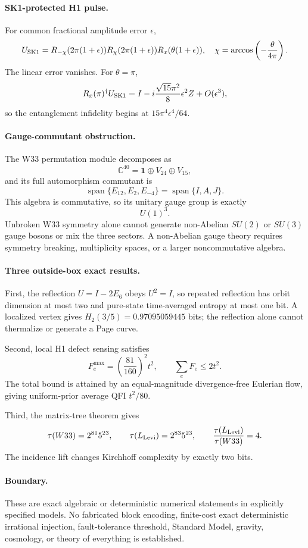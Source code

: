 \paragraph{SK1-protected H1 pulse.}
For common fractional amplitude error $\epsilon$,
\[
U_{\rm SK1}=R_{-\chi}(2\pi(1+\epsilon))R_\chi(2\pi(1+\epsilon))
R_x(\theta(1+\epsilon)),
\quad
\chi=\arccos\left(-\frac\theta{4\pi}\right).
\]
The linear error vanishes.  For $\theta=\pi$,
\[
R_x(\pi)^\dagger U_{\rm SK1}
=I-i\frac{\sqrt{15}\pi^2}{8}\epsilon^2Z+O(\epsilon^3),
\]
so the entanglement infidelity begins at
$15\pi^4\epsilon^4/64$.

\paragraph{Gauge-commutant obstruction.}
The W33 permutation module decomposes as
\[
\mathbb C^{40}=\mathbf1\oplus V_{24}\oplus V_{15},
\]
and its full automorphism commutant is
\[
\operatorname{span}\{E_{12},E_2,E_{-4}\}=\operatorname{span}\{I,A,J\}.
\]
This algebra is commutative, so its unitary gauge group is exactly
\[
\boxed{U(1)^3}.
\]
Unbroken W33 symmetry alone cannot generate non-Abelian $SU(2)$ or $SU(3)$
gauge bosons or mix the three sectors.  A non-Abelian gauge theory requires
symmetry breaking, multiplicity spaces, or a larger noncommutative algebra.

\paragraph{Three outside-box exact results.}
First, the reflection $U=I-2E_6$ obeys $U^2=I$, so repeated reflection has
orbit dimension at most two and pure-state time-averaged entropy at most one
bit.  A localized vertex gives $H_2(3/5)=0.97095059445$ bits; the reflection
alone cannot thermalize or generate a Page curve.

Second, local H1 defect sensing satisfies
\[
F_e^{\max}=\left(\frac{81}{160}\right)^2t^2,
\qquad
\sum_eF_e\le2t^2.
\]
The total bound is attained by an equal-magnitude divergence-free Eulerian
flow, giving uniform-prior average QFI $t^2/80$.

Third, the matrix-tree theorem gives
\[
\tau(W33)=2^{81}5^{23},
\qquad
\tau(L_{\rm Levi})=2^{83}5^{23},
\qquad
\frac{\tau(L_{\rm Levi})}{\tau(W33)}=4.
\]
The incidence lift changes Kirchhoff complexity by exactly two bits.

\paragraph{Boundary.}
These are exact algebraic or deterministic numerical statements in explicitly
specified models.  No fabricated block encoding, finite-cost exact
deterministic irrational injection, fault-tolerance threshold, Standard Model,
gravity, cosmology, or theory of everything is established.
